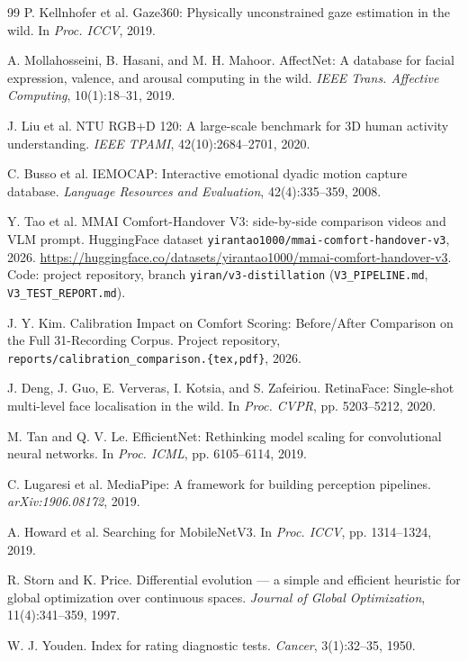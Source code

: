 \documentclass{article}
\newcommand{\code}[1]{\texttt{\small #1}}
\begin{document}
\begin{thebibliography}{99}
 P. Kellnhofer et al. Gaze360: Physically unconstrained gaze estimation in the wild. In \emph{Proc. ICCV}, 2019.

 A. Mollahosseini, B. Hasani, and M. H. Mahoor. AffectNet: A database for facial expression, valence, and arousal computing in the wild. \emph{IEEE Trans. Affective Computing}, 10(1):18--31, 2019.

 J. Liu et al. NTU RGB+D 120: A large-scale benchmark for 3D human activity understanding. \emph{IEEE TPAMI}, 42(10):2684--2701, 2020.

 C. Busso et al. IEMOCAP: Interactive emotional dyadic motion capture database. \emph{Language Resources and Evaluation}, 42(4):335--359, 2008.

 Y. Tao et al. MMAI Comfort-Handover V3: side-by-side comparison videos and VLM prompt. HuggingFace dataset \code{yirantao1000/mmai-comfort-handover-v3}, 2026. \url{https://huggingface.co/datasets/yirantao1000/mmai-comfort-handover-v3}. Code: project repository, branch \code{yiran/v3-distillation} (\code{V3\_PIPELINE.md}, \code{V3\_TEST\_REPORT.md}).

 J. Y. Kim. Calibration Impact on Comfort Scoring: Before/After Comparison on the Full 31-Recording Corpus. Project repository, \code{reports/calibration\_comparison.\{tex,pdf\}}, 2026.

 J. Deng, J. Guo, E. Ververas, I. Kotsia, and S. Zafeiriou. RetinaFace: Single-shot multi-level face localisation in the wild. In \emph{Proc. CVPR}, pp. 5203--5212, 2020.

 M. Tan and Q. V. Le. EfficientNet: Rethinking model scaling for convolutional neural networks. In \emph{Proc. ICML}, pp. 6105--6114, 2019.

 C. Lugaresi et al. MediaPipe: A framework for building perception pipelines. \emph{arXiv:1906.08172}, 2019.

 A. Howard et al. Searching for MobileNetV3. In \emph{Proc. ICCV}, pp. 1314--1324, 2019.

 R. Storn and K. Price. Differential evolution --- a simple and efficient heuristic for global optimization over continuous spaces. \emph{Journal of Global Optimization}, 11(4):341--359, 1997.

 W. J. Youden. Index for rating diagnostic tests. \emph{Cancer}, 3(1):32--35, 1950.


\end{thebibliography}
\end{document}

